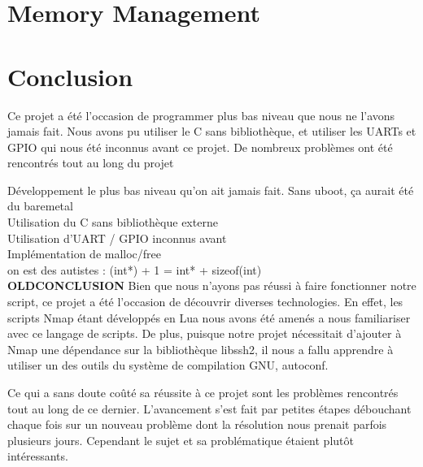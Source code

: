 \documentclass[frenchb]{article}
\begin{document}
\section{Memory Management}

\clearpage

\section*{Conclusion}

\noindent Ce projet a été l'occasion de programmer plus bas niveau que nous ne l'avons jamais fait. Nous avons pu utiliser le C sans bibliothèque, et utiliser les UARTs et GPIO qui nous été inconnus avant ce projet.
De nombreux problèmes ont été rencontrés tout au long du projet

Développement le plus bas niveau qu'on ait jamais fait. Sans uboot, ça aurait été du baremetal\\
Utilisation du C sans bibliothèque externe\\
Utilisation d'UART / GPIO inconnus avant\\
Implémentation de malloc/free\\
on est des autistes : (int*) + 1 = int* + sizeof(int)\\


{\Large\textbf{OLDCONCLUSION}}
Bien que nous n'ayons pas réussi à faire fonctionner notre script, ce projet a été l'occasion de découvrir diverses technologies. En effet, les scripts Nmap étant développés en Lua nous avons été amenés a nous familiariser avec ce langage de scripts. De plus, puisque notre projet nécessitait d'ajouter à Nmap une dépendance sur la bibliothèque \textsf{libssh2}, il nous a fallu apprendre à utiliser un des outils du système de compilation GNU, \textsf{autoconf}. 

Ce qui a sans doute coûté sa réussite à ce projet sont les problèmes rencontrés tout au long de ce dernier. L'avancement s'est fait par petites étapes débouchant chaque fois sur un nouveau problème dont la résolution nous prenait parfois plusieurs jours. Cependant le sujet et sa problématique étaient plutôt intéressants.
\end{document}
